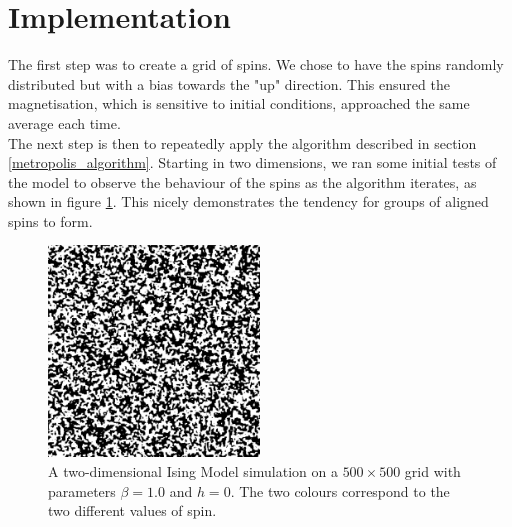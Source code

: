 \documentclass[11pt]{article}
\begin{document}
	\section{Implementation}
	
	The first step was to create a grid of spins. We chose to have the spins randomly distributed but with a bias towards the "up" direction. This ensured the magnetisation, which is sensitive to initial conditions, approached the same average each time.\\
	
	The next step is then to repeatedly apply the algorithm described in section \ref{metropolis_algorithm}. Starting in two dimensions, we ran some initial tests of the model to observe the behaviour of the spins as the algorithm iterates, as shown in figure \ref{fig:ising_grid}. This nicely demonstrates the tendency for groups of aligned spins to form.
	\begin{figure}[H]
		\begin{center}
			\includegraphics[width=0.5\textwidth]{./img/ising-simulation.png}
		\end{center}
		\caption{A two-dimensional Ising Model simulation on a $500\times 500$ grid with parameters $\beta = 1.0$ and $h = 0$. The two colours correspond to the two different values of spin.}
		\label{fig:ising_grid}
	\end{figure}
	
\end{document}

